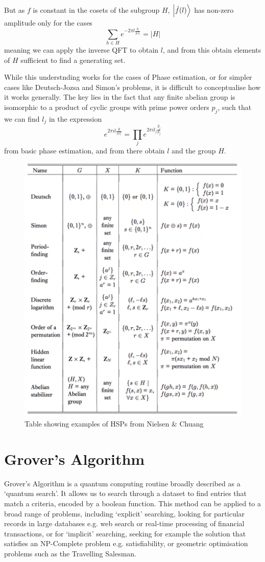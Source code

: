 \documentclass[11pt]{article}
\begin{document}
But as $f$ is constant in the cosets of the subgroup $H$, $\ket{\hat{f}(l)}$ has non-zero amplitude only for the cases
\[\sum_{h\in H}e^{-2\pi l \frac{h}{\vert G\vert}}=\vert H\vert\]
meaning we can apply the inverse QFT to obtain $l$, and from this obtain elements of $H$ sufficient to find a generating set.

While this understnding works for the cases of Phase estimation, or for simpler cases like Deutsch-Jozsa and Simon's problems, it is difficult to conceptualise how it works generally. The key lies in the fact that any finite abelian group is isomorphic to a product of cyclic groups with prime power orders $p_{j}$, such that we can find $l_{j}$ in the expression
\[e^{2\pi i l \frac{g}{\vert G\vert}}=\prod_{j}e^{2\pi i l_{j}\frac{g_{j}}{p_{j}}}\]
from basic phase estimation, and from there obtain $l$ and the group $H$.

\begin{figure}
    \centering
    \includegraphics[width=.8\textwidth]{HSPs.png}
    \caption{Table showing examples of HSPs from Nielsen \& Chuang}
\end{figure}

\section{Grover's Algorithm}

Grover’s Algorithm is a quantum computing routine broadly described as a `quantum search’. It allows us to search through a dataset to find entries that match a criteria, encoded by a boolean function. This method can be applied to a broad range of problems, including `explicit’ searching, looking for particular records in large databases e.g. web search or real-time processing of financial transactions, or for `implicit’ searching, seeking for example the solution that satisfies an NP-Complete problem e.g. satisfiability, or geometric optimisation problems such as the Travelling Salesman.
\end{document}
